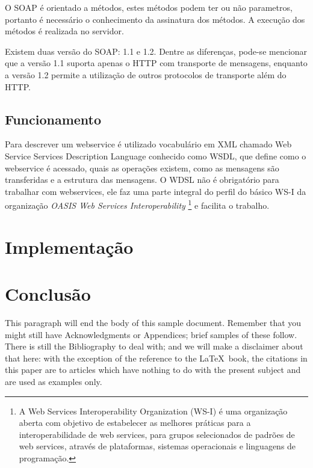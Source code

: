 \documentclass{acm_proc_article-sp}
\begin{document}
		O SOAP é orientado a métodos, estes métodos podem ter ou não parametros, portanto é necessário o conhecimento da assinatura dos métodos. A execução dos métodos é realizada no servidor.
		
		Existem duas versão do SOAP: 1.1 e 1.2. Dentre as diferenças, pode-se mencionar que a versão 1.1 suporta apenas o HTTP com transporte de mensagens, enquanto a versão 1.2 permite a utilização de outros protocolos de transporte além do HTTP. \cite{WEBSERVICESZEND}
		
	\subsection{Funcionamento}
	
		Para descrever um webservice é utilizado vocabulário em XML chamado Web Service Services Description Language conhecido como WSDL, que define como o webservice é acessado, quais as operações existem, como as mensagens são transferidas e a estrutura das mensagens. O WDSL não é obrigatório para trabalhar com webservices, ele faz uma parte integral do perfil do básico WS-I da organização \emph{OASIS Web Services Interoperability} \footnote{A Web Services Interoperability Organization (WS-I) é uma organização aberta com objetivo de estabelecer as melhores práticas para a interoperabilidade de web services, para grupos selecionados de padrões de web services, através de plataformas, sistemas operacionais e linguagens de programação.\cite{OASIS-WS-I-SITE}} e facilita o trabalho. 
\section{Implementação}

\section{Conclusão}
This paragraph will end the body of this sample document.
Remember that you might still have Acknowledgments or
Appendices; brief samples of these
follow.  There is still the Bibliography to deal with; and
we will make a disclaimer about that here: with the exception
of the reference to the \LaTeX\ book, the citations in
this paper are to articles which have nothing to
do with the present subject and are used as
examples only.
\end{document}
